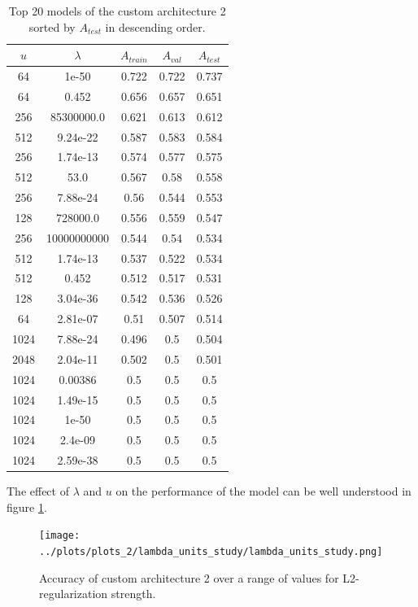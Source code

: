 \begin{table}[ht]
\centering
\begin{tabular}{ |c|c|c|c|c| }
\hline
$u$ & $\lambda$ & $A_{train}$ & $A_{val}$ & $A_{test}$ \\
\hline
64 & 1e-50 & 0.722 & 0.722 & 0.737 \\
64 & 0.452 & 0.656 & 0.657 & 0.651 \\
256 & 85300000.0 & 0.621 & 0.613 & 0.612 \\
512 & 9.24e-22 & 0.587 & 0.583 & 0.584 \\
256 & 1.74e-13 & 0.574 & 0.577 & 0.575 \\
512 & 53.0 & 0.567 & 0.58 & 0.558 \\
256 & 7.88e-24 & 0.56 & 0.544 & 0.553 \\
128 & 728000.0 & 0.556 & 0.559 & 0.547 \\
256 & 10000000000 & 0.544 & 0.54 & 0.534 \\
512 & 1.74e-13 & 0.537 & 0.522 & 0.534 \\
512 & 0.452 & 0.512 & 0.517 & 0.531 \\
128 & 3.04e-36 & 0.542 & 0.536 & 0.526 \\
64 & 2.81e-07 & 0.51 & 0.507 & 0.514 \\
1024 & 7.88e-24 & 0.496 & 0.5 & 0.504 \\
2048 & 2.04e-11 & 0.502 & 0.5 & 0.501 \\
1024 & 0.00386 & 0.5 & 0.5 & 0.5 \\
1024 & 1.49e-15 & 0.5 & 0.5 & 0.5 \\
1024 & 1e-50 & 0.5 & 0.5 & 0.5 \\
1024 & 2.4e-09 & 0.5 & 0.5 & 0.5 \\
1024 & 2.59e-38 & 0.5 & 0.5 & 0.5 \\
\hline
\end{tabular}
\caption{Top 20 models of the custom architecture 2 sorted by $A_{test}$ in descending order.}
\label{table:top20_custom2}
\end{table}

The effect of $\lambda$ and $u$ on the performance of the model can be well understood in figure \ref{fig:lambda_units_study_custom2}.

\begin{figure}[ht]
    \centering
    \texttt{[image: ../plots/plots\_2/lambda\_units\_study/lambda\_units\_study.png]}
    \caption{Accuracy of custom architecture 2 over a range of values for L2-regularization strength.}
    \label{fig:lambda_units_study_custom2}
\end{figure}
